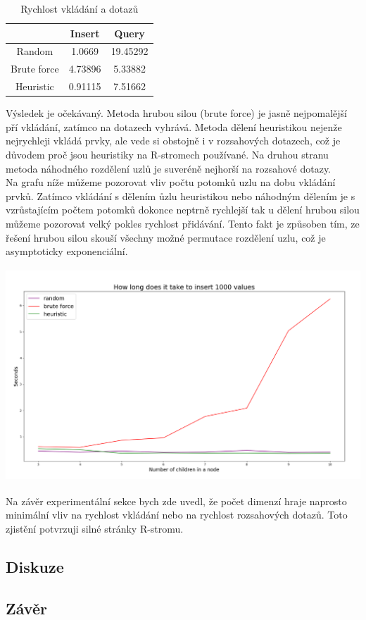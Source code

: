 \documentclass[12pt,a4paper]{article}
\begin{document}
\begin{table}[ht]
\begin{center}
\caption{Rychlost vkládání a dotazů}
\label{tbl:bins} %
\begin{tabular}{|c|cc|} 
\hline
\multicolumn{1}{|c}{} & \multicolumn{1}{c}{Insert} & \multicolumn{1}{c|}{Query} \\
\hline
Random & 1.0669 &   19.45292 \\
\hline
Brute force & 4.73896 &   5.33882 \\
\hline
Heuristic & 0.91115 &   7.51662 \\
\hline
\end{tabular}
\end{center}
\end{table}

Výsledek je očekávaný. Metoda hrubou silou (brute force) je jasně nejpomalější pří vkládání, zatímco na dotazech vyhrává. Metoda dělení heuristikou nejenže nejrychleji vkládá prvky, ale vede si obstojně i v rozsahových dotazech, což je důvodem proč jsou heuristiky na R-stromech používané. Na druhou stranu metoda náhodného rozdělení uzlů je suveréně nejhorší na rozsahové dotazy.\\[0.5cm]
Na grafu níže můžeme pozorovat vliv počtu potomků uzlu na dobu vkládání prvků. Zatímco vkládání s dělením ůzlu heuristikou nebo náhodným dělením je s vzrůstajícím počtem potomků dokonce neptrně rychlejší tak u dělení hrubou silou můžeme pozorovat velký pokles rychlost přidávání. Tento fakt je způsoben tím, ze řešení hrubou silou skouší všechny možné permutace rozdělení uzlu, což je asymptoticky exponenciální.

\begin{center}
\includegraphics[width=15cm, height=8cm]{nOfChildren}
\end{center}

Na závěr experimentální sekce bych zde uvedl, že počet dimenzí hraje naprosto minimální vliv na rychlost vkládání nebo na rychlost rozsahových dotazů. Toto zjistění potvrzuji silné stránky R-stromu.

\subsection*{Diskuze}

\subsection*{Závěr}
\end{document}

